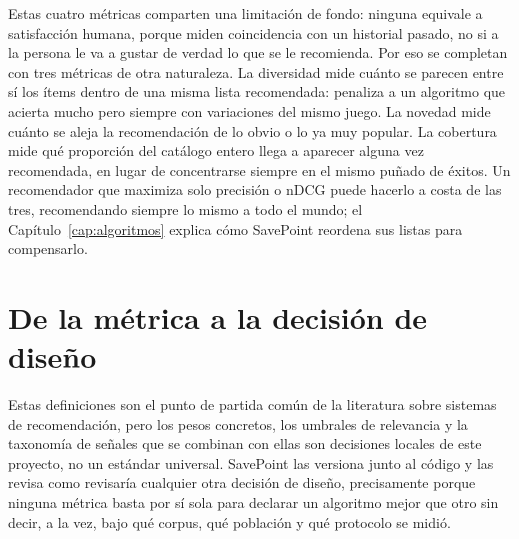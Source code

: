 Estas cuatro métricas comparten una limitación de fondo: ninguna equivale a satisfacción
humana, porque miden coincidencia con un historial pasado, no si a la persona le va a gustar de
verdad lo que se le recomienda. Por eso se completan con tres métricas de otra naturaleza. La
diversidad mide cuánto se parecen entre sí los ítems dentro de una misma lista recomendada:
penaliza a un algoritmo que acierta mucho pero siempre con variaciones del mismo juego. La
novedad mide cuánto se aleja la recomendación de lo obvio o lo ya muy popular. La cobertura
mide qué proporción del catálogo entero llega a aparecer alguna vez recomendada, en lugar de
concentrarse siempre en el mismo puñado de éxitos. Un recomendador que maximiza solo precisión
o nDCG puede hacerlo a costa de las tres, recomendando siempre lo mismo a todo el mundo; el
Capítulo~\ref{cap:algoritmos} explica cómo SavePoint reordena sus listas para compensarlo.

\section{De la métrica a la decisión de diseño}\label{sec:fundamentos-decision}

Estas definiciones son el punto de partida común de la literatura sobre sistemas de
recomendación, pero los pesos concretos, los umbrales de relevancia y la taxonomía de señales
que se combinan con ellas son decisiones locales de este proyecto, no un estándar universal.
SavePoint las versiona junto al código y las revisa como revisaría cualquier otra decisión de
diseño, precisamente porque ninguna métrica basta por sí sola para declarar un algoritmo mejor
que otro sin decir, a la vez, bajo qué corpus, qué población y qué protocolo se midió.
